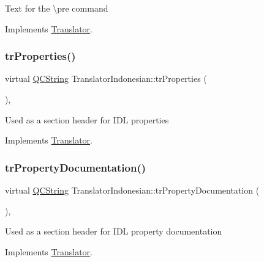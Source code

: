Text for the \textbackslash{}pre command 

Implements \mbox{\hyperlink{class_translator}{Translator}}.

\mbox{\label{class_translator_indonesian_a023a5b541469941d419e993d9615c394}} 
\subsubsection{\texorpdfstring{trProperties()}{trProperties()}}
{\footnotesize\ttfamily virtual \mbox{\hyperlink{class_q_c_string}{Q\+C\+String}} Translator\+Indonesian\+::tr\+Properties (\begin{DoxyParamCaption}{ }\end{DoxyParamCaption})\hspace{0.3cm}{\ttfamily [inline]}, {\ttfamily [virtual]}}

Used as a section header for I\+DL properties 

Implements \mbox{\hyperlink{class_translator}{Translator}}.

\mbox{\label{class_translator_indonesian_ab2b7842c255cf5a10d101fa4382e5e43}} 
\subsubsection{\texorpdfstring{trPropertyDocumentation()}{trPropertyDocumentation()}}
{\footnotesize\ttfamily virtual \mbox{\hyperlink{class_q_c_string}{Q\+C\+String}} Translator\+Indonesian\+::tr\+Property\+Documentation (\begin{DoxyParamCaption}{ }\end{DoxyParamCaption})\hspace{0.3cm}{\ttfamily [inline]}, {\ttfamily [virtual]}}

Used as a section header for I\+DL property documentation 

Implements \mbox{\hyperlink{class_translator}{Translator}}.

\mbox{\label{class_translator_indonesian_a0e40fe65e68857e1ef798d28d920dbf3}} 
